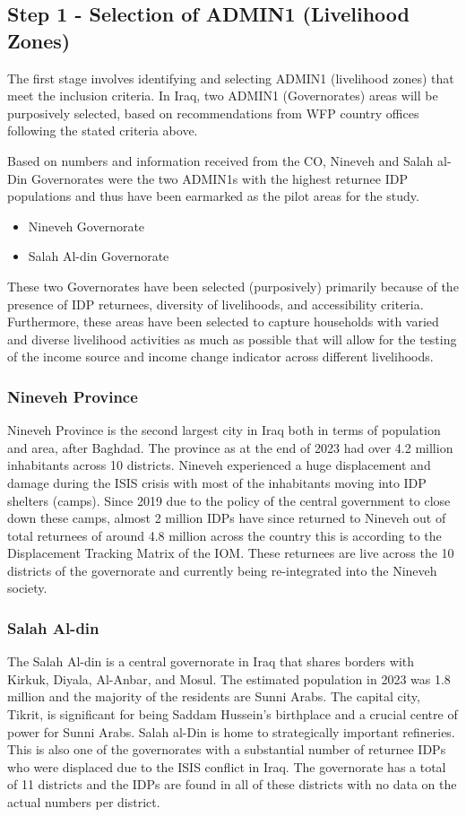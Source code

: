 \documentclass[11pt,harvard]{article}
\begin{document}
	\subsection{Step 1 - Selection of ADMIN1 (Livelihood Zones)}
	The first stage involves identifying and selecting ADMIN1 (livelihood zones) that meet the inclusion criteria. In Iraq, two ADMIN1 (Governorates) areas will be purposively selected, based on recommendations from WFP country offices following the stated criteria above.
	
	Based on numbers and information received from the CO, Nineveh and Salah al-Din Governorates were the two ADMIN1s with the highest returnee IDP populations and thus have been earmarked as the pilot areas for the study.
		
	\begin{itemize}[left=2.0em]
		\item[1.] Nineveh Governorate
		\item[2.] Salah Al-din Governorate
	\end{itemize}
		These two Governorates have been selected (purposively) primarily because of the presence of IDP returnees, diversity of livelihoods, and accessibility criteria. Furthermore, these areas have been selected to capture households with varied and diverse livelihood activities as much as possible that will allow for the testing of the income source and income change indicator across different livelihoods. 
	
	\subsubsection{Nineveh Province}
	Nineveh Province is the second largest city in Iraq both in terms of population and area, after Baghdad. The province as at the end of 2023 had over 4.2 million inhabitants across 10 districts. Nineveh experienced a huge displacement and damage during the ISIS crisis with most of the inhabitants moving into IDP shelters (camps). Since 2019 due to the policy of the central government to close down these camps, almost 2 million IDPs have since returned to Nineveh out of total returnees of around 4.8 million across the country this is according to the Displacement Tracking Matrix of the IOM. These returnees are live across the 10 districts of the governorate and currently being re-integrated into the Nineveh society. 
	
	\subsubsection{Salah Al-din}
	The Salah Al-din is a central governorate in Iraq that shares borders with Kirkuk, Diyala, Al-Anbar, and Mosul. The estimated population in 2023 was 1.8 million and the majority of the residents are Sunni Arabs. The capital city, Tikrit, is significant for being Saddam Hussein's birthplace and a crucial centre of power for Sunni Arabs. Salah al-Din is home to strategically important refineries. This is also one of the governorates with a substantial number of returnee IDPs who were displaced due to the ISIS conflict in Iraq. The governorate has a total of 11 districts and the IDPs are found in all of these districts with no data on the actual numbers per district.
	
\end{document}
